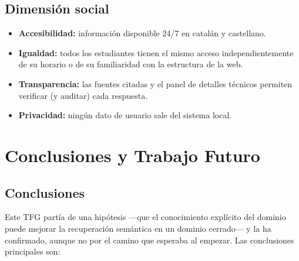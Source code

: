 \documentclass[12pt, a4paper, twoside]{report}
\begin{document}
\section{Dimensi\'on social}

\begin{itemize}
  \item \textbf{Accesibilidad:} informaci\'on disponible 24/7 en catal\'an y castellano.
  \item \textbf{Igualdad:} todos los estudiantes tienen el mismo acceso independientemente de su horario o de su familiaridad con la estructura de la web.
  \item \textbf{Transparencia:} las fuentes citadas y el panel de detalles t\'ecnicos permiten verificar (y auditar) cada respuesta.
  \item \textbf{Privacidad:} ning\'un dato de usuario sale del sistema local.
\end{itemize}


\chapter{Conclusiones y Trabajo Futuro}
\label{ch:conclusiones}

\section{Conclusiones}

Este TFG part\'ia de una hip\'otesis ---que el conocimiento expl\'icito del dominio puede mejorar la recuperaci\'on sem\'antica en un dominio cerrado--- y la ha confirmado, aunque no por el camino que esperaba al empezar. Las conclusiones principales son:
\end{document}
